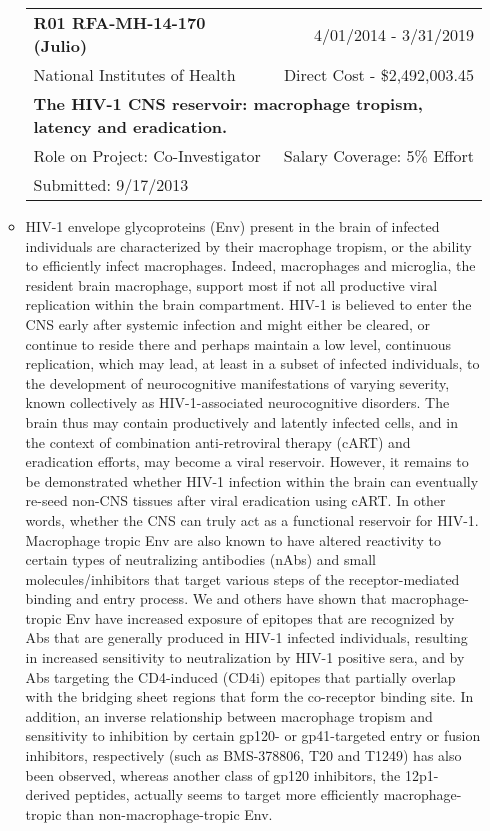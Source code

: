 \documentclass[a4paper,11pt]{article}
\makeatletter
\newenvironment{fullwidth}
    {\par
     \setlength{\@totalleftmargin}{0pt}%
     \setlength{\linewidth}{\hsize}%
     \list{}{\setlength{\leftmargin}{0pt}}
     \item\relax}
    {\endlist}
\makeatother
\begin{document}
\begin{enumerate}
\begin{itemize}
  
  \begin{longtable}{lr}
    \textbf{R01 RFA-MH-14-170 (Julio)} & 4/01/2014 - 3/31/2019 \\
    National Institutes of Health & Direct Cost - \$2,492,003.45  \\
    \multicolumn{2}{p{0.973\textwidth}}{\bfseries The HIV-1 CNS reservoir: macrophage tropism, latency and eradication.} \\
    Role on Project:  Co-Investigator & Salary Coverage: 5\% Effort \\
    Submitted: 9/17/2013\\
    \end{longtable}
    \begin{fullwidth}
     HIV-1 envelope glycoproteins (Env) present in the brain of infected individuals are characterized by their macrophage tropism, or the ability to efficiently infect macrophages. 
Indeed, macrophages and microglia, the resident brain macrophage, support most if not all productive viral replication within the brain compartment. 
HIV-1 is believed to enter the CNS early after systemic infection and might either be cleared, or continue to reside there and perhaps maintain a low level, continuous replication, which may lead, at least in a subset of infected individuals, to the development of neurocognitive manifestations of varying severity, known collectively as HIV-1-associated neurocognitive disorders. 
The brain thus may contain productively and latently infected cells, and in the context of combination anti-retroviral therapy (cART) and eradication efforts, may become a viral reservoir. 
However, it remains to be demonstrated whether HIV-1 infection within the brain can eventually re-seed non-CNS tissues after viral eradication using cART. 
In other words, whether the CNS can truly act as a functional reservoir for HIV-1. 
Macrophage tropic Env are also known to have altered reactivity to certain types of neutralizing antibodies (nAbs) and small molecules/inhibitors that target various steps of the receptor-mediated binding and entry process. 
We and others have shown that macrophage-tropic Env have increased exposure of epitopes that are recognized by Abs that are generally produced in HIV-1 infected individuals, resulting in increased sensitivity to neutralization by HIV-1 positive sera, and by Abs targeting the CD4-induced (CD4i) epitopes that partially overlap with the bridging sheet regions that form the co-receptor binding site. 
In addition, an inverse relationship between macrophage tropism and sensitivity to inhibition by certain gp120- or gp41-targeted entry or fusion inhibitors, respectively (such as BMS-378806, T20 and T1249) has also been observed, whereas another class of gp120 inhibitors, the 12p1-derived peptides, actually seems to target more efficiently macrophage-tropic than non-macrophage-tropic Env. 

\end{fullwidth}
\end{itemize}
\end{enumerate}
\end{document}
